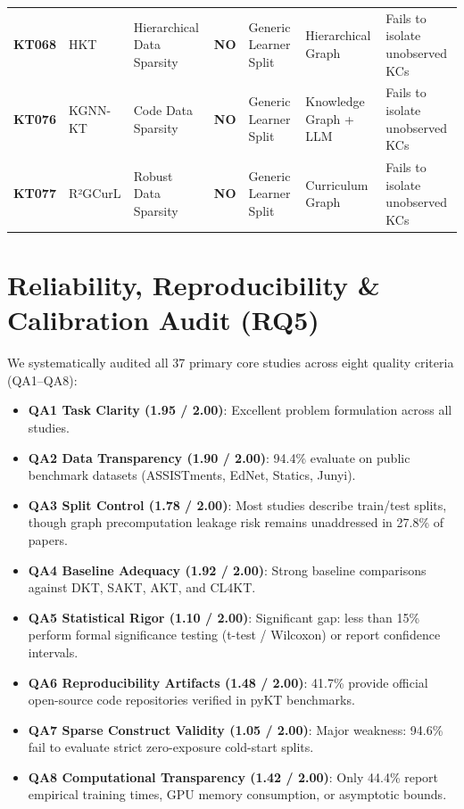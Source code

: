 ﻿\documentclass[10pt,journal,compsoc]{IEEEtran}
\begin{document}
\begin{table}[t]
{\begin{tabular}{lllllll}
\textbf{KT068} & HKT \cite{KT068_HKT_2025} & Hierarchical Data Sparsity & \textbf{NO} & Generic Learner Split & Hierarchical Graph & Fails to isolate unobserved KCs \\
\textbf{KT076} & KGNN-KT \cite{KT076_KGNNKT_2025} & Code Data Sparsity & \textbf{NO} & Generic Learner Split & Knowledge Graph + LLM & Fails to isolate unobserved KCs \\
\textbf{KT077} & R²GCurL \cite{KT077_R2GCurL_2026} & Robust Data Sparsity & \textbf{NO} & Generic Learner Split & Curriculum Graph & Fails to isolate unobserved KCs \\
\bottomrule
\end{tabular}
}
\end{table}

\section{Reliability, Reproducibility \& Calibration Audit (RQ5)}

We systematically audited all 37 primary core studies across eight quality criteria (QA1--QA8):
\begin{itemize}
    \item \textbf{QA1 Task Clarity (1.95 / 2.00)}: Excellent problem formulation across all studies.
    \item \textbf{QA2 Data Transparency (1.90 / 2.00)}: 94.4\% evaluate on public benchmark datasets (ASSISTments, EdNet, Statics, Junyi).
    \item \textbf{QA3 Split Control (1.78 / 2.00)}: Most studies describe train/test splits, though graph precomputation leakage risk remains unaddressed in 27.8\% of papers.
    \item \textbf{QA4 Baseline Adequacy (1.92 / 2.00)}: Strong baseline comparisons against DKT, SAKT, AKT, and CL4KT.
    \item \textbf{QA5 Statistical Rigor (1.10 / 2.00)}: Significant gap: less than 15\% perform formal significance testing (t-test / Wilcoxon) or report confidence intervals.
    \item \textbf{QA6 Reproducibility Artifacts (1.48 / 2.00)}: 41.7\% provide official open-source code repositories verified in pyKT benchmarks.
    \item \textbf{QA7 Sparse Construct Validity (1.05 / 2.00)}: Major weakness: 94.6\% fail to evaluate strict zero-exposure cold-start splits.
    \item \textbf{QA8 Computational Transparency (1.42 / 2.00)}: Only 44.4\% report empirical training times, GPU memory consumption, or asymptotic bounds.
\end{itemize}
\end{document}
